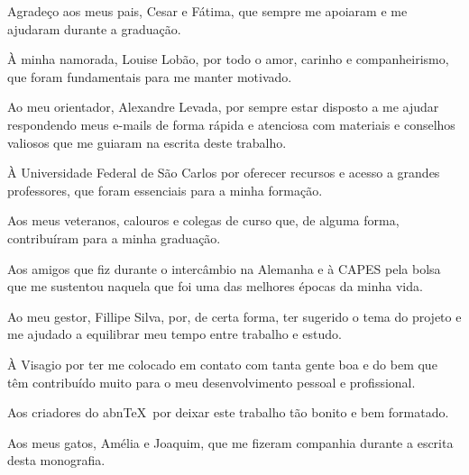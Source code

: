 \begin{agradecimentos}
    Agradeço aos meus pais, Cesar e Fátima, que sempre me apoiaram e me ajudaram durante a graduação.
    
    À minha namorada, Louise Lobão, por todo o amor, carinho e companheirismo, que foram fundamentais para me manter motivado.
    
    Ao meu orientador, Alexandre Levada, por sempre estar disposto a me ajudar respondendo meus e-mails de forma rápida e atenciosa com materiais e conselhos valiosos que me guiaram na escrita deste trabalho.
    
    À Universidade Federal de São Carlos por oferecer recursos e acesso a grandes professores, que foram essenciais para a minha formação.
    
    Aos meus veteranos, calouros e colegas de curso que, de alguma forma, contribuíram para a minha graduação.
    
    Aos amigos que fiz durante o intercâmbio na Alemanha e à CAPES pela bolsa que me sustentou naquela que foi uma das melhores épocas da minha vida.
    
    Ao meu gestor, Fillipe Silva, por, de certa forma, ter sugerido o tema do projeto e me ajudado a equilibrar meu tempo entre trabalho e estudo.
    
    À Visagio por ter me colocado em contato com tanta gente boa e do bem que têm contribuído muito para o meu desenvolvimento pessoal e profissional.
    
    Aos criadores do abn\TeX\ por deixar este trabalho tão bonito e bem formatado.

    Aos meus gatos, Amélia e Joaquim, que me fizeram companhia durante a escrita desta monografia.
\end{agradecimentos}